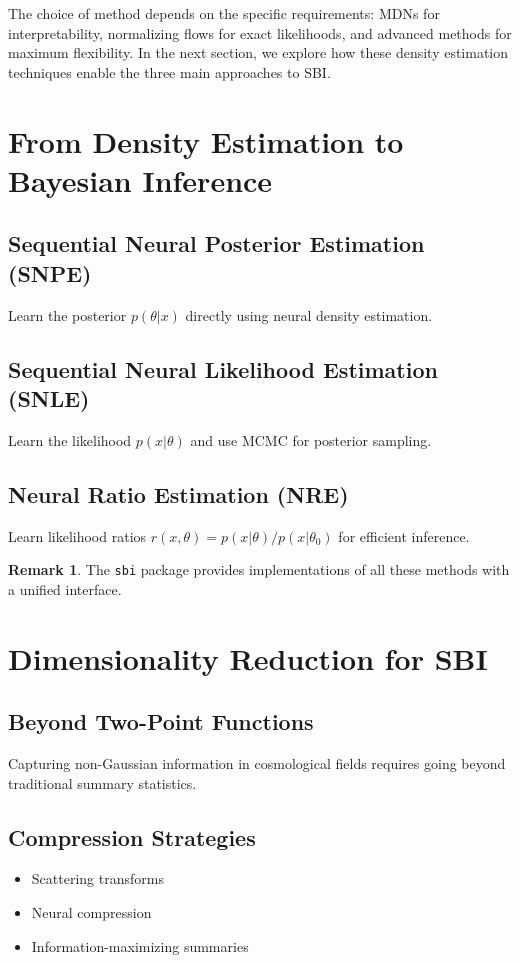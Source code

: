 \documentclass[11pt,a4paper]{article}
\theoremstyle{definition}
\newtheorem*{remark}{Remark}
\begin{document}
The choice of method depends on the specific requirements: MDNs for interpretability, normalizing flows for exact likelihoods, and advanced methods for maximum flexibility. In the next section, we explore how these density estimation techniques enable the three main approaches to SBI.

\section{From Density Estimation to Bayesian Inference}

\subsection{Sequential Neural Posterior Estimation (SNPE)}
Learn the posterior $p(\theta|x)$ directly using neural density estimation.

\subsection{Sequential Neural Likelihood Estimation (SNLE)}
Learn the likelihood $p(x|\theta)$ and use MCMC for posterior sampling.

\subsection{Neural Ratio Estimation (NRE)}
Learn likelihood ratios $r(x,\theta) = p(x|\theta) / p(x|\theta_0)$ for efficient inference.

\begin{remark}
The \texttt{sbi} package provides implementations of all these methods with a unified interface.
\end{remark}

\section{Dimensionality Reduction for SBI}

\subsection{Beyond Two-Point Functions}
Capturing non-Gaussian information in cosmological fields requires going beyond traditional summary statistics.

\subsection{Compression Strategies}
\begin{itemize}
    \item Scattering transforms
    \item Neural compression
    \item Information-maximizing summaries
\end{itemize}
\end{document}
